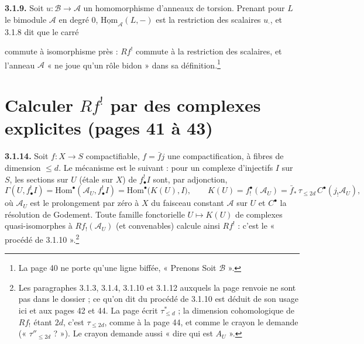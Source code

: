 \documentclass[11pt,a4paper]{article}
\begin{document}
\textbf{3.1.9.} Soit $u\colon \mathcal{B} \to \mathcal{A}$ un homomorphisme
d'anneaux de torsion. Prenant pour $L$ le bimodule $\mathcal{A}$ en degré $0$,
$\underline{\mathrm{Hom}}_{\mathcal{A}}(L, -)$ est la restriction des scalaires
$u_\cdot$, et 3.1.8 dit que le carré


commute à isomorphisme près : $Rf^!$ commute à la restriction des scalaires,
et l'anneau $\mathcal{A}$ « ne joue qu'un rôle bidon » dans sa
définition.\footnote{La page 40 ne porte qu'une ligne biffée, « Prenons Soit
$\mathcal{B}$ ».}

\section*{Calculer $Rf^!$ par des complexes explicites (pages 41 à 43)}

\textbf{3.1.14.} Soit $f\colon X \to S$ compactifiable, $f = \bar f j$ une
compactification, à fibres de dimension $\leqslant d$. Le mécanisme est le
suivant : pour un complexe d'injectifs $I$ sur $S$, les sections sur $U$
(étale sur $X$) de $f^!_{\bullet}I$ sont, par adjonction,
\[
\Gamma(U, f^!_{\bullet}I) = \mathrm{Hom}^{\bullet}(\mathcal{A}_U, f^!_{\bullet}I)
= \mathrm{Hom}^{\bullet}\bigl(K(U), I\bigr), \qquad
K(U) = f_!^{\bullet}(\mathcal{A}_U) = \bar f_*\,\tau_{\leqslant 2d}\,
C^{\bullet}(j_!\mathcal{A}_U),
\]
où $\mathcal{A}_U$ est le prolongement par zéro à $X$ du faisceau constant
$\mathcal{A}$ sur $U$ et $C^{\bullet}$ la résolution de Godement. Toute
famille fonctorielle $U \mapsto K(U)$ de complexes quasi-isomorphes à
$Rf_!(\mathcal{A}_U)$ (et convenables) calcule ainsi $Rf^!$ : c'est le
« procédé de 3.1.10 ».\footnote{Les paragraphes 3.1.3, 3.1.4, 3.1.10 et
3.1.12 auxquels la page renvoie ne sont pas dans le dossier ; ce qu'on dit du
procédé de 3.1.10 est déduit de son usage ici et aux pages 42 et 44. La page
écrit $\tau^*_{\leqslant d}$ ; la dimension cohomologique de $Rf_!$ étant
$2d$, c'est $\tau_{\leqslant 2d}$, comme à la page 44, et comme le crayon le
demande (« $\tau''_{\leqslant 2d}$ ? »). Le crayon demande aussi « dire qui est
$A_U$ ».}
\end{document}
